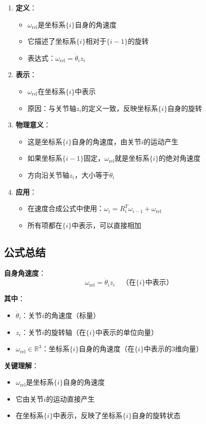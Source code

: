 \documentclass[12pt,a4paper]{article}
\begin{document}
\begin{enumerate}
\item \textbf{定义}：
\begin{itemize}
\item $\omega_{\text{rel}}$是坐标系$\{i\}$自身的角速度
\item 它描述了坐标系$\{i\}$相对于$\{i-1\}$的旋转
\item 表达式：$\omega_{\text{rel}} = \dot{\theta}_i z_i$
\end{itemize}

\item \textbf{表示}：
\begin{itemize}
\item $\omega_{\text{rel}}$在坐标系$\{i\}$中表示
\item 原因：与关节轴$z_i$的定义一致，反映坐标系$\{i\}$自身的旋转
\end{itemize}

\item \textbf{物理意义}：
\begin{itemize}
\item 这是坐标系$\{i\}$自身的角速度，由关节$i$的运动产生
\item 如果坐标系$\{i-1\}$固定，$\omega_{\text{rel}}$就是坐标系$\{i\}$的绝对角速度
\item 方向沿关节轴$z_i$，大小等于$\dot{\theta}_i$
\end{itemize}

\item \textbf{应用}：
\begin{itemize}
\item 在速度合成公式中使用：$\omega_i = R_i^T \omega_{i-1} + \omega_{\text{rel}}$
\item 所有项都在$\{i\}$中表示，可以直接相加
\end{itemize}
\end{enumerate}

\subsection{公式总结}

\textbf{自身角速度}：
\begin{equation}
\omega_{\text{rel}} = \dot{\theta}_i z_i \quad \text{（在$\{i\}$中表示）}
\end{equation}

\textbf{其中}：
\begin{itemize}
\item $\dot{\theta}_i$：关节$i$的角速度（标量）
\item $z_i$：关节$i$的旋转轴（在$\{i\}$中表示的单位向量）
\item $\omega_{\text{rel}} \in \mathbb{R}^3$：坐标系$\{i\}$自身的角速度（在$\{i\}$中表示的3维向量）
\end{itemize}

\textbf{关键理解}：
\begin{itemize}
\item $\omega_{\text{rel}}$是坐标系$\{i\}$自身的角速度
\item 它由关节$i$的运动直接产生
\item 在坐标系$\{i\}$中表示，反映了坐标系$\{i\}$自身的旋转状态
\end{itemize}
\end{document}
